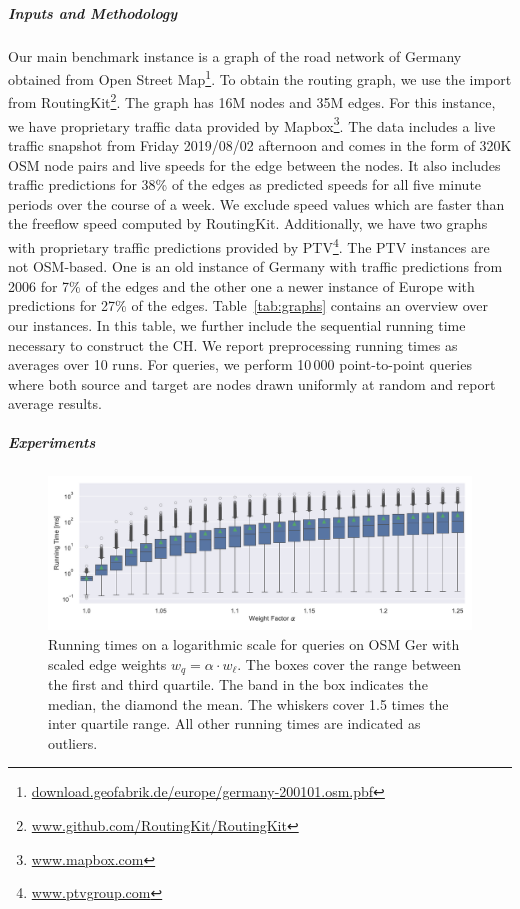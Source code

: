 \documentclass[a4paper,USenglish,cleveref, autoref, thm-restate]{lipics-v2019}
\begin{document}
\subparagraph{Inputs and Methodology}
Our main benchmark instance is a graph of the road network of Germany obtained from Open Street Map\footnote{\url{download.geofabrik.de/europe/germany-200101.osm.pbf}}.
To obtain the routing graph, we use the import from RoutingKit\footnote{\url{www.github.com/RoutingKit/RoutingKit}}.
The graph has 16M nodes and 35M edges.
For this instance, we have proprietary traffic data provided by Mapbox\footnote{\url{www.mapbox.com}}.
The  data includes a live traffic snapshot from Friday 2019/08/02 afternoon and comes in the form of 320K OSM node pairs and live speeds for the edge between the nodes.
It also includes traffic predictions for 38\% of the edges as predicted speeds for all five minute periods over the course of a week.
We exclude speed values which are faster than the freeflow speed computed by RoutingKit.
Additionally, we have two graphs with proprietary traffic predictions provided by PTV\footnote{\url{www.ptvgroup.com}}.
The PTV instances are not OSM-based.
One is an old instance of Germany with traffic predictions from 2006 for 7\% of the edges and the other one a newer instance of Europe with predictions for 27\% of the edges.
Table~\ref{tab:graphs} contains an overview over our instances.
In this table, we further include the sequential running time necessary to construct the CH.
We report preprocessing running times as averages over 10 runs.
For queries, we perform 10\,000 point-to-point queries where both source and target are nodes drawn uniformly at random and report average results.

\subparagraph{Experiments}

\begin{figure}
\centering
\includegraphics[width=\linewidth]{fig/scaled_weights.pdf}
\caption{
Running times on a logarithmic scale for queries on OSM Ger with scaled edge weights $w_q = \alpha \cdot w_\ell$.
The boxes cover the range between the first and third quartile.
The band in the box indicates the median, the diamond the mean.
The whiskers cover 1.5 times the inter quartile range.
All other running times are indicated as outliers.
}\label{fig:scaled_weights}
\end{figure}
\end{document}
